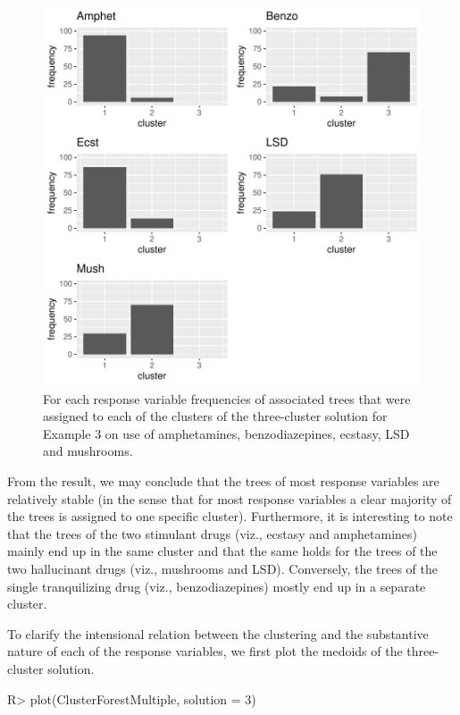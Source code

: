 \begin{figure}[H]
	\centering
    \includegraphics[scale=0.7]{articleV3-treesource3}
	\caption{For each response variable frequencies of associated trees that were assigned to each of the clusters of the three-cluster solution for Example 3 on use of amphetamines, benzodiazepines, ecstasy, LSD and mushrooms.}
	\label{fig:Ex3Frequencies}	
\end{figure}

From the result, we may conclude that the trees of most response variables are relatively stable (in the sense that for most response variables a clear majority of the trees is assigned to one specific cluster). Furthermore, it is interesting to note that the trees of the two stimulant drugs (viz., ecstasy and amphetamines) mainly end up in the same cluster and that the same holds for the trees of the two hallucinant drugs (viz., mushrooms and LSD). Conversely, the trees of the single tranquilizing drug (viz., benzodiazepines) mostly end up in a separate cluster.

To clarify the intensional relation between the clustering and the substantive nature of each of the response variables, we first plot the medoids of the three-cluster solution.
\begin{example}
R> plot(ClusterForestMultiple, solution = 3)
\end{example}


